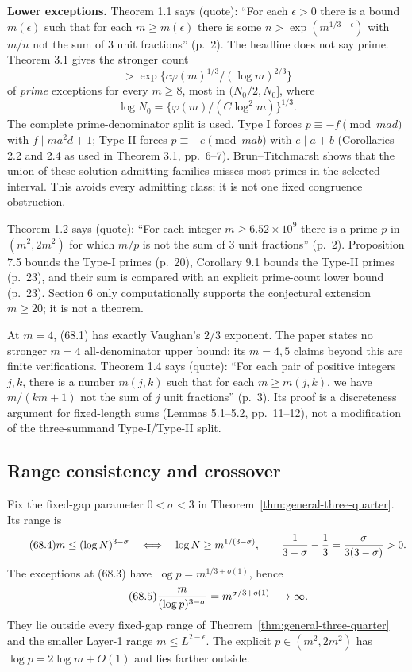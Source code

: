 \documentclass[10pt,reqno]{amsart}
\theoremstyle{definition}
\newcommand{\1}{\mathbf 1}
\begin{document}
\medskip\noindent\textbf{Lower exceptions.}
Theorem 1.1 says (quote): ``For each $\epsilon>0$ there is a bound
$m(\epsilon)$ such that for each $m\geq m(\epsilon)$ there is some
$n>\exp(m^{1/3-\epsilon})$ with $m/n$ not the sum of $3$ unit fractions''
(p.~2).  The headline does not say prime.  Theorem 3.1 gives the stronger
count
\begin{equation}\tag{68.2}
              >\exp\{c\varphi(m)^{1/3}/(\log m)^{2/3}\}
\end{equation}
of \emph{prime} exceptions for every $m\geq8$, most in
$(N_0/2,N_0]$, where
\begin{equation}\tag{68.3}
                  \log N_0=\{\varphi(m)/(C\log^2m)\}^{1/3}.
\end{equation}
The complete prime-denominator split is used.  Type I forces
$p\equiv-f\pmod {mad}$ with $f\mid ma^2d+1$; Type II forces
$p\equiv-e\pmod {mab}$ with $e\mid a+b$ (Corollaries 2.2 and 2.4 as used
in Theorem 3.1, pp.~6--7).  Brun--Titchmarsh shows that the union of these
solution-admitting families misses most primes in the selected interval.
This avoids every admitting class; it is not one fixed congruence
obstruction.

Theorem 1.2 says (quote): ``For each integer
$m\geq6.52\mathbin{\times}10^9$ there is a prime $p$ in $(m^2,2m^2)$ for
which $m/p$ is not the sum of $3$ unit fractions'' (p.~2).  Proposition 7.5
bounds the Type-I primes (p.~20), Corollary 9.1 bounds the Type-II primes
(p.~23), and their sum is compared with an explicit prime-count lower bound
(p.~23).  Section 6 only computationally supports the conjectural extension
$m\geq20$; it is not a theorem.

At $m=4$, (68.1) has exactly Vaughan's $2/3$ exponent.  The paper states no
stronger $m=4$ all-denominator upper bound; its $m=4,5$ claims beyond this
are finite verifications.  Theorem 1.4 says (quote): ``For each pair of
positive integers $j,k$, there is a number $m(j,k)$ such that for each
$m\geq m(j,k)$, we have $m/(km+1)$ not the sum of $j$ unit fractions''
(p.~3).  Its proof is a discreteness argument for fixed-length sums
(Lemmas 5.1--5.2, pp.~11--12), not a modification of the three-summand
Type-I/Type-II split.

\subsection{Range consistency and crossover}
Fix the fixed-gap parameter $0<\sigma<3$ in
Theorem~\ref{thm:general-three-quarter}.  Its range is
\begin{equation}\tag{68.4}
 m\leq(\log N)^{3-\sigma}
 \quad\Longleftrightarrow\quad
 \log N\geq m^{1/(3-\sigma)},
 \qquad {1\over3-\sigma}-{1\over3}
       ={\sigma\over3(3-\sigma)}>0.
\end{equation}
The exceptions at (68.3) have $\log p=m^{1/3+o(1)}$, hence
\begin{equation}\tag{68.5}
 {m\over(\log p)^{3-\sigma}}
       =m^{\sigma/3+o(1)}\longrightarrow\infty.
\end{equation}
They lie outside every fixed-gap range of
Theorem~\ref{thm:general-three-quarter} and the smaller Layer-1 range
$m\leq L^{2-\epsilon}$.  The explicit $p\in(m^2,2m^2)$ has
$\log p=2\log m+O(1)$ and lies farther outside.
\end{document}
